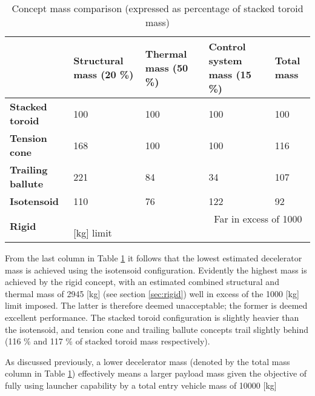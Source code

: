 \begin{table}[h]
\centering
\caption{Concept mass comparison (expressed as percentage of stacked toroid mass)}\label{tab:cmass}
\begin{tabular}{|p{}|p{}|p{}|p{}||p{}|}

\hline
                          & \textbf{Structural mass (20 \%)} & \textbf{Thermal mass (50 \%)} & \textbf{Control system mass (15 \%)} & \textbf{Total mass} \\ \hline
\textbf{Stacked toroid}   &  100                                 & 100                          & 100                                      &\cellcolor{green!70}  100                           \\ \hline
\textbf{Tension cone}     &  168                               & 100                               &  100                                     &\cellcolor{yellow!70} 116                                 \\ \hline
\textbf{Trailing ballute} &  221                                 & 84                               & 34                                      &\cellcolor{yellow!70} 107 \\ \hline
\textbf{Isotensoid}       &  110                                 & 76                               & 122                                      &\cellcolor{green!70} 92 \\ \hline \hline
\textbf{Rigid}            &  \multicolumn{4}{|p{0.762\textwidth}|}{\cellcolor{red!60} ~~~~~~~~~~~~~~~~~~~~~~~~~~~~~Far in excess of 1000 [kg] limit}    \\ \hline
\end{tabular}
\end{table}

From the last column in Table \ref{tab:cmass} it follows that the lowest estimated decelerator mass is achieved using the isotensoid configuration. Evidently the highest mass is achieved by the rigid concept, with an estimated combined structural and thermal mass of 2945 [kg] (see section \ref{sec:rigid}) well in excess of the 1000 [kg] limit imposed. The latter is therefore deemed unacceptable; the former is deemed excellent performance. The stacked toroid configuration is slightly heavier than the isotensoid, and tension cone and trailing ballute concepts trail slightly behind (116 \% and 117 \% of stacked toroid mass respectively).

As discussed previously, a lower decelerator mass (denoted by the total mass column in Table \ref{tab:cmass}) effectively means a larger payload mass given the objective of fully using launcher capability by a total entry vehicle mass of 10000 [kg]

